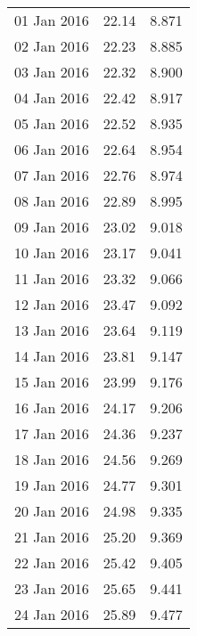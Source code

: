\documentclass[11pt,a4paper,twoside]{article}
\begin{document}
\begin{longtable}{lcc}
01 Jan 2016                    & 22.14                & 8.871      \\
02 Jan 2016                    & 22.23                & 8.885      \\
03 Jan 2016                    & 22.32                & 8.900      \\
04 Jan 2016                    & 22.42                & 8.917      \\
05 Jan 2016                    & 22.52                & 8.935      \\
06 Jan 2016                    & 22.64                & 8.954      \\
07 Jan 2016                    & 22.76                & 8.974      \\
08 Jan 2016                    & 22.89                & 8.995      \\
09 Jan 2016                    & 23.02                & 9.018      \\
10 Jan 2016                    & 23.17                & 9.041      \\
11 Jan 2016                    & 23.32                & 9.066      \\
12 Jan 2016                    & 23.47                & 9.092      \\
13 Jan 2016                    & 23.64                & 9.119      \\
14 Jan 2016                    & 23.81                & 9.147      \\
15 Jan 2016                    & 23.99                & 9.176     \\
16 Jan 2016                    & 24.17                & 9.206      \\
17 Jan 2016                    & 24.36                & 9.237      \\
18 Jan 2016                    & 24.56                & 9.269      \\
19 Jan 2016                    & 24.77                & 9.301      \\
20 Jan 2016                    & 24.98                & 9.335      \\
21 Jan 2016                    & 25.20                & 9.369      \\
22 Jan 2016                    & 25.42                & 9.405      \\
23 Jan 2016                    & 25.65                & 9.441      \\
24 Jan 2016                    & 25.89                & 9.477      \\

\end{longtable}
\end{document}
